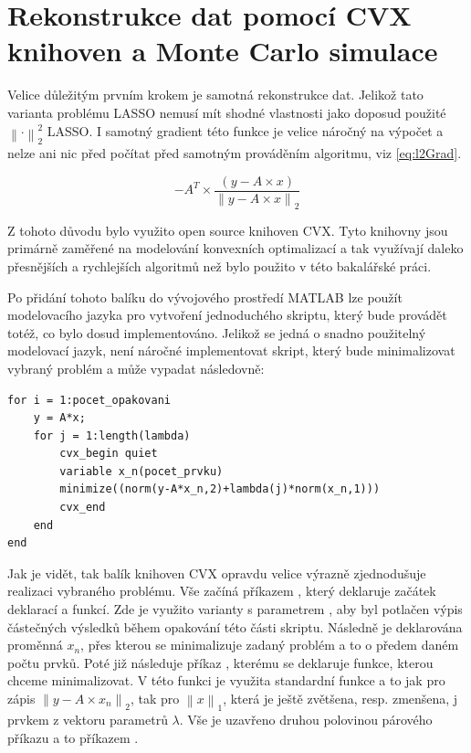 \documentclass[FM,BP]{tulthesis}
\newcounter{Vzorce}
\begin{document}
\section{Rekonstrukce dat pomocí CVX knihoven a Monte Carlo simulace}
Velice důležitým prvním krokem je samotná rekonstrukce dat. Jelikož tato varianta problému LASSO nemusí mít shodné vlastnosti jako doposud použité $\left\| \cdot \right\|_{2}^{2} $ LASSO. I samotný gradient této funkce je velice náročný na výpočet a nelze ani nic před počítat před samotným prováděním algoritmu, viz \ref{eq:l2Grad}.

\begin{equation} \label{eq:l2Grad}  \tag{Vzorec \theVzorce}
-A^{T} \times \frac{\left(y-A \times x\right)}{\left\| y - A \times x\right\|_{2} }
\end{equation}

Z tohoto důvodu bylo využito open source knihoven CVX. Tyto knihovny jsou primárně zaměřené na modelování konvexních optimalizací a tak využívají daleko přesnějších a rychlejších algoritmů než bylo použito v této bakalářské práci. 

Po přidání tohoto balíku do vývojového prostředí MATLAB lze použít modelovacího jazyka pro vytvoření jednoduchého skriptu, který bude provádět totéž, co bylo dosud implementováno. Jelikož se jedná o snadno použitelný modelovací jazyk, není náročné implementovat skript, který bude minimalizovat vybraný problém a může vypadat následovně: 

\begin{lstlisting}
for i = 1:pocet_opakovani
    y = A*x;
    for j = 1:length(lambda)
        cvx_begin quiet
	    variable x_n(pocet_prvku)
	    minimize((norm(y-A*x_n,2)+lambda(j)*norm(x_n,1)))
	    cvx_end
    end
end
\end{lstlisting}

Jak je vidět, tak balík knihoven CVX opravdu velice výrazně zjednodušuje realizaci vybraného problému. Vše začíná příkazem , který deklaruje začátek deklarací a funkcí. Zde je využito varianty s parametrem , aby byl potlačen výpis částečných výsledků během opakování této části skriptu. Následně je deklarována proměnná $x_n$, přes kterou se minimalizuje zadaný problém a to o předem daném počtu prvků. Poté již následuje příkaz , kterému se deklaruje funkce, kterou chceme minimalizovat. V této funkci je využita standardní funkce  a to jak pro zápis $\left\| y - A \times x_n\right\|_2$, tak pro $ \left\| x \right\|_1  $, která je ještě zvětšena, resp. zmenšena, j prvkem z vektoru parametrů $\lambda$. Vše je uzavřeno druhou polovinou párového příkazu a to příkazem .
\end{document}
